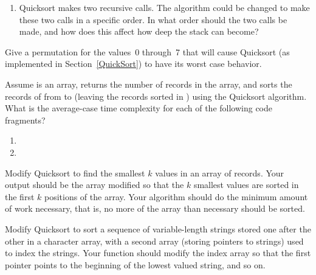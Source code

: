 \begin{exercises}
\begin{enumerate}
\item Quicksort makes two recursive calls.
The algorithm could be changed to make these two calls in a specific
order.
In what order should the two calls be made, and how does this affect
how deep the stack can become?
\end{enumerate}

\item
Give a permutation for the values~0 through~7 that will cause
Quicksort (as implemented in Section~\ref{QuickSort}) to have its
worst case behavior.

\item
Assume  is an array, 
 returns the number of
records in the array, and  sorts the records of
 from  to  (leaving the records sorted in
) using the Quicksort algorithm.
What is the average-case time complexity for each of the following
code fragments?

\vspace{-0.1pt}
\begin{enumerate}

\vspace{-\bigskipamount}
\item {}

\vspace{-\bigskipamount}
\item {}
\end{enumerate}
\vspace{-\bigskipamount}

\item
Modify Quicksort to find the smallest \(k\)
values in an array of records.
Your output should be the array modified so that the \(k\) smallest
values are sorted in the first \(k\) positions of the array.
Your algorithm should do the minimum amount of work necessary, that
is, no more of the array than necessary should be sorted.

\item
Modify Quicksort
to sort a sequence of variable-length strings stored one after the
other in a character array, with a second array (storing pointers to
strings) used to index the strings.
Your function should modify the index array so that the first pointer
points to the beginning of the lowest valued string, and so on.


\end{exercises}
